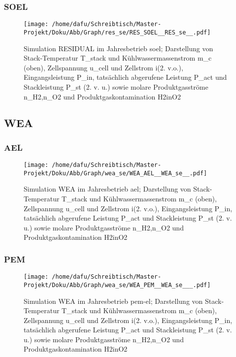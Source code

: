 \documentclass[onecolumn,10pt,titlepage]{article}
\begin{document}
\subsubsection{SOEL}
\begin{figure}[H]

	\centering
	\texttt{[image: /home/dafu/Schreibtisch/Master-Projekt/Doku/Abb/Graph/res\_se/RES\_SOEL\_\_RES\_se\_\_.pdf]}
	\caption[Simulation RESIDUAL im Jahresbetrieb \gls{soel}]{Simulation RESIDUAL im Jahresbetrieb \gls{soel}; Darstellung von Stack-Temperatur \gls{T_stack} und Kühlwassermassenstrom \gls{m_c} (oben), Zellspannung \gls{u_cell} und Zellstrom \gls{i}(2. v.o.), Eingangsleistung \gls{P_in},  tatsächlich abgerufene Leistung \gls{P_act} und Stackleistung \gls{P_st} (2. v. u.) sowie molare Produktgasströme \gls{n_H2},\gls{n_O2} und Produktgaskontamination \gls{H2inO2}}
	\label{fig:plt_se_RES_SOEL}
\end{figure}

\subsection{WEA}
\subsubsection{AEL}
\begin{figure}[H]
	\centering
	\texttt{[image: /home/dafu/Schreibtisch/Master-Projekt/Doku/Abb/Graph/wea\_se/WEA\_AEL\_\_WEA\_se\_\_.pdf]}

	\caption[Simulation WEA im Jahresbetrieb \gls{ael}]{Simulation WEA im Jahresbetrieb \gls{ael}; Darstellung von Stack-Temperatur \gls{T_stack} und Kühlwassermassenstrom \gls{m_c} (oben), Zellspannung \gls{u_cell} und Zellstrom \gls{i}(2. v.o.), Eingangsleistung \gls{P_in},  tatsächlich abgerufene Leistung \gls{P_act} und Stackleistung \gls{P_st} (2. v. u.) sowie molare Produktgasströme \gls{n_H2},\gls{n_O2} und Produktgaskontamination \gls{H2inO2}}
	\label{fig:plt_se_WEA_AEL}
\end{figure}
\subsubsection{PEM}
\begin{figure}
	\centering
	\texttt{[image: /home/dafu/Schreibtisch/Master-Projekt/Doku/Abb/Graph/wea\_se/WEA\_PEM\_\_WEA\_se\_\_\_.pdf]}

	\caption[Simulation WEA im Jahresbetrieb \gls{pem}-\gls{el}]{Simulation WEA im Jahresbetrieb \gls{pem}-\gls{el}; Darstellung von Stack-Temperatur \gls{T_stack} und Kühlwassermassenstrom \gls{m_c} (oben), Zellspannung \gls{u_cell} und Zellstrom \gls{i}(2. v.o.), Eingangsleistung \gls{P_in},  tatsächlich abgerufene Leistung \gls{P_act} und Stackleistung \gls{P_st} (2. v. u.) sowie molare Produktgasströme \gls{n_H2},\gls{n_O2} und Produktgaskontamination \gls{H2inO2}}
	\label{fig:plt_se_WEA_PEM}
\end{figure}
\end{document}
